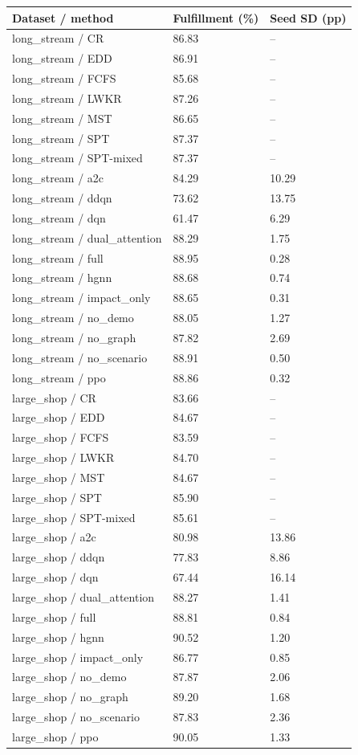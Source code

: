 \begin{tabular}{lll}
\toprule
Dataset / method & Fulfillment (\%) & Seed SD (pp)\\
\midrule
long\_stream / CR & 86.83 & --\\
long\_stream / EDD & 86.91 & --\\
long\_stream / FCFS & 85.68 & --\\
long\_stream / LWKR & 87.26 & --\\
long\_stream / MST & 86.65 & --\\
long\_stream / SPT & 87.37 & --\\
long\_stream / SPT-mixed & 87.37 & --\\
long\_stream / a2c & 84.29 & 10.29\\
long\_stream / ddqn & 73.62 & 13.75\\
long\_stream / dqn & 61.47 & 6.29\\
long\_stream / dual\_attention & 88.29 & 1.75\\
long\_stream / full & 88.95 & 0.28\\
long\_stream / hgnn & 88.68 & 0.74\\
long\_stream / impact\_only & 88.65 & 0.31\\
long\_stream / no\_demo & 88.05 & 1.27\\
long\_stream / no\_graph & 87.82 & 2.69\\
long\_stream / no\_scenario & 88.91 & 0.50\\
long\_stream / ppo & 88.86 & 0.32\\
large\_shop / CR & 83.66 & --\\
large\_shop / EDD & 84.67 & --\\
large\_shop / FCFS & 83.59 & --\\
large\_shop / LWKR & 84.70 & --\\
large\_shop / MST & 84.67 & --\\
large\_shop / SPT & 85.90 & --\\
large\_shop / SPT-mixed & 85.61 & --\\
large\_shop / a2c & 80.98 & 13.86\\
large\_shop / ddqn & 77.83 & 8.86\\
large\_shop / dqn & 67.44 & 16.14\\
large\_shop / dual\_attention & 88.27 & 1.41\\
large\_shop / full & 88.81 & 0.84\\
large\_shop / hgnn & 90.52 & 1.20\\
large\_shop / impact\_only & 86.77 & 0.85\\
large\_shop / no\_demo & 87.87 & 2.06\\
large\_shop / no\_graph & 89.20 & 1.68\\
large\_shop / no\_scenario & 87.83 & 2.36\\
large\_shop / ppo & 90.05 & 1.33\\
\bottomrule
\end{tabular}